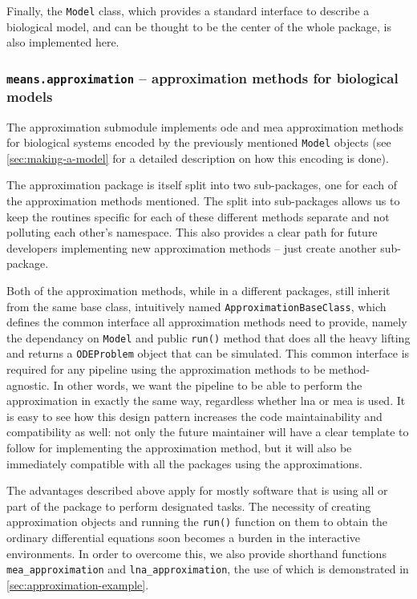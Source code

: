 Finally, the \verb"Model" class, which provides a standard interface to describe a biological model, and can be thought to be the center of the whole package, is also implemented here.

\subsubsection{{\tt means.approximation} -- approximation methods for biological models}

The approximation submodule implements \gls{ode} and \gls{mea} approximation methods for biological systems encoded by the previously mentioned \verb"Model" objects (see \autoref{sec:making-a-model} for a detailed description on how this encoding is done).

The approximation package is itself split into two sub-packages, one for each of the approximation methods mentioned. The split into sub-packages allows us to keep the routines specific for each of these different methods separate and not polluting each other's namespace. This also provides a clear path for future developers implementing new approximation methods -- just create another sub-package.

Both of the approximation methods, while in a different packages, still inherit from the same base class, intuitively named \verb"ApproximationBaseClass", which defines the common interface all approximation methods need to provide, namely the dependancy on \verb"Model" and public \verb"run()" method that does all the heavy lifting and returns a \verb"ODEProblem" object that can be simulated.
This common interface is required for any pipeline using the approximation methods to be method-agnostic. In other words, we want the pipeline to be able to perform the approximation in exactly the same way, regardless whether \gls{lna} or \gls{mea} is used. 
It is easy to see how this design pattern increases the code maintainability and compatibility as well: not only the future maintainer will have a clear template to follow for implementing the approximation method, but it will also be immediately compatible with all the packages using the approximations.

The advantages described above apply for mostly software that is using all or part of the \means package to perform designated tasks. The necessity of creating approximation objects and running the \verb"run()" function on them to obtain the ordinary differential equations soon becomes a burden in the interactive environments. In order to overcome this, we also provide shorthand functions \verb"mea_approximation" and \verb"lna_approximation", the use of which is demonstrated in \autoref{sec:approximation-example}.

